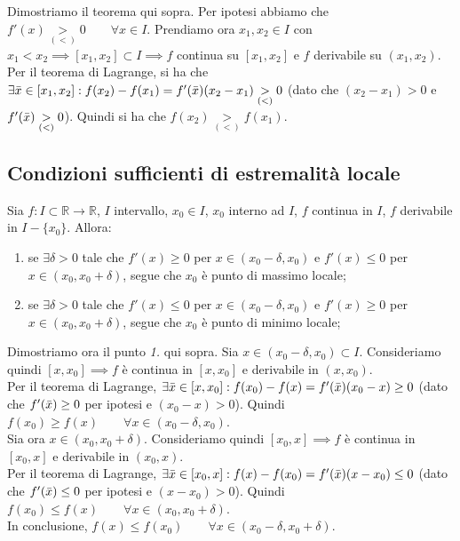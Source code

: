 \documentclass{article}
\begin{document}
\noindent Dimostriamo il teorema qui sopra. Per ipotesi abbiamo che $f'(x) \underset{(<)}{>} 0 \qquad \forall x \in I$. Prendiamo ora $x_1, x_2 \in I$ con $x_1 < x_2 \implies [x_1, x_2] \subset I \implies f$ continua su $[x_1, x_2]$ e $f$ derivabile su $(x_1, x_2)$.\\
Per il teorema di Lagrange, si ha che $\exists \Bar{x} \in [x_1, x_2] : f(x_2) - f(x_1) = f'(\Bar{x})(x_2 - x_1) \underset{(<)}{>} 0$ (dato che $(x_2 - x_1) > 0$ e $f'(\Bar{x}) \underset{(<)}{>} 0$). Quindi si ha che $f(x_2) \underset{(<)}{>} f(x_1)$.

\subsection{Condizioni sufficienti di estremalità locale}
Sia $f: I \subset \mathbb{R} \xrightarrow{} \mathbb{R}$, $I$ intervallo, $x_0 \in I$, $x_0$ interno ad $I$, $f$ continua in $I$, $f$ derivabile in $I - \{x_0\}$. Allora:
\begin{enumerate}
    \item se $\exists \delta > 0$ tale che $f'(x) \geq 0$ per $x \in (x_0 - \delta, x_0)$ e $f'(x) \leq 0$ per $x \in (x_0, x_0 + \delta)$, segue che $x_0$ è punto di massimo locale;
    \item se $\exists \delta > 0$ tale che $f'(x) \leq 0$ per $x \in (x_0 - \delta, x_0)$ e $f'(x) \geq 0$ per $x \in (x_0, x_0 + \delta)$, segue che $x_0$ è punto di minimo locale;
\end{enumerate}

\noindent Dimostriamo ora il punto \textit{1.} qui sopra. Sia $x \in (x_0 - \delta, x_0) \subset I$. Consideriamo quindi $[x, x_0] \implies f$ è continua in $[x, x_0]$ e derivabile in $(x, x_0)$.\\
Per il teorema di Lagrange, $\exists \Bar{x} \in [x, x_0] : f(x_0) - f(x) = f'(\Bar{x})(x_0 - x) \geq 0$ (dato che $f'(\Bar{x}) \geq 0$ per ipotesi e $(x_0 - x) > 0$). Quindi $f(x_0) \geq f(x) \qquad \forall x \in (x_0 - \delta, x_0)$.\\
Sia ora $x \in (x_0, x_0 + \delta)$. Consideriamo quindi $[x_0, x] \implies f$ è continua in $[x_0, x]$ e derivabile in $(x_0, x)$. \\
Per il teorema di Lagrange, $\exists \Bar{x} \in [x_0, x] : f(x) - f(x_0) = f'(\Bar{x})(x - x_0) \leq 0$ (dato che $f'(\Bar{x}) \leq 0$ per ipotesi e $(x - x_0) > 0$). Quindi $f(x_0) \leq f(x) \qquad \forall x \in (x_0, x_0 + \delta)$.\\
In conclusione, $f(x) \leq f(x_0) \qquad \forall x \in (x_0 - \delta, x_0 + \delta)$.\\
\end{document}
